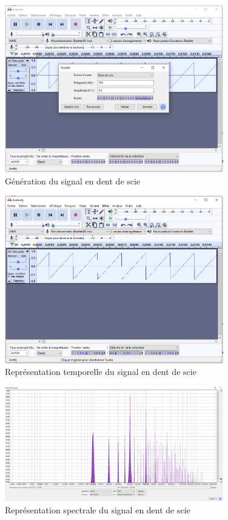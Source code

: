 \documentclass[a4paper]{article}
\begin{document}
\begin{figure}[H]
    \centering
    \includegraphics[width=0.85\textwidth]{images/DentScie001.PNG}
    \caption{Génération du signal en dent de scie}
    \label{fig:DentScie001}
\end{figure}

\begin{figure}[H]
    \centering
    \includegraphics[width=0.85\textwidth]{images/DentScie002.PNG}
    \caption{Représentation temporelle du signal en dent de scie}
    \label{fig:DentScie002}
\end{figure}

\begin{figure}[H]
    \centering
    \includegraphics[width=0.85\textwidth]{images/DentScie003.PNG}
    \caption{Représentation spectrale du signal en dent de scie}
    \label{fig:DentScie003}
\end{figure}
\end{document}
